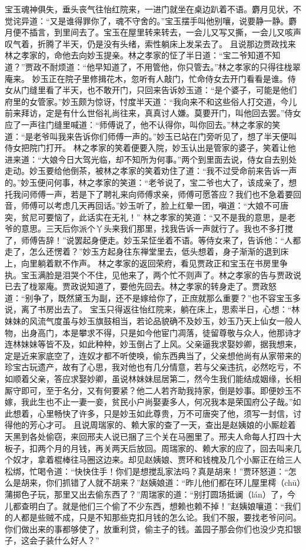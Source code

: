 \documentclass[12pt,oneside]{book}
\begin{document}
宝玉魂神俱失，垂头丧气往怡红院来，一进门就坐在桌边趴着不语。麝月见状，不觉诧异道：“又是谁得罪你了，魂不守舍的。”宝玉摆手叫他别嚷，说要静一静。麝月便不插言，到里间去了。宝玉在屋里转来转去，一会儿又写又撕，一会儿又咳声叹气着，折腾了半天，仍是没有头绪，索性躺床上发呆去了。
且说那边贾政找来林之孝家的，命他去向妙玉提亲。林之孝家的怔了半日道：“宝二爷知道不知道？”贾政不耐烦道：“他早知道了，不用管他，你只管去。”林之孝家的只得往栊翠庵来。
妙玉正在院子里修揖花木，忽听有人敲门，忙命侍女去开门看看是谁。侍女从门缝里看了半天，也不敢开门，只回来告诉妙玉道：“是个婆子，可能是他们府里的女管家。”妙玉颇为惊讶，忖度半天道：“我向来不和这些俗人打交道，今儿前来拜访，定是有什么世俗礼尚往来，真真讨人嫌。莫要开门，叫他回去罢。”侍女应了一声往门缝里喊道：“师傅说了，他不认得你，叫你回去。”林之孝家的笑道：“是老爷叫我来告诉你们师傅一声的。”妙玉已站在门旁听见了，想了半天便叫侍女把院门打开。
林之孝家的笑着便要入院，妙玉认出是管家的婆子，笑着让他进来道：“大娘今日大驾光临，却不知所为何事。”两个到里面去说，侍女自去别处走动。妙玉要给他倒茶，被林之孝家的笑着劝住了道：“我不过受命前来告诉一声的。”妙玉便问何事，林之孝家的笑道：“老爷说了，宝二爷也大了，该成亲了，想托我问师傅一声，若是下了聘礼来向师傅求亲，师傅可愿答应？我们也不急着要回音，师傅可以考虑几天再回话。”妙玉听了，脸上红晕一团，嗔道：“大娘不可唐突，贫尼可要恼了，此话实在无礼！”
林之孝家的笑道：“又不是我的意思，是老爷的意思。三天后你派个丫头来我们那里，找我告诉一声就行了。我也不多打搅了，师傅告辞！”说罢起身便走。妙玉呆怔坐着不语。等侍女来了，告诉他：“人都走了，怎么还愣着？”妙玉方起身往东禅堂里去，低头想着，身子渐渐的退到床上，向里躺着默不作声。
林之孝家的返回荣府，看见贾政正和宝玉在书房里争执。宝玉满脸是泪哭个不住，见他来了，两个忙不则声了。林之孝家的告与贾政说已去了栊翠庵。贾政说知道了，要他先回去。林之孝家的转身走了。贾政怒道：“别争了，既然黛玉为副，还不是嫁给你了，正庶就那么重要？”也不容宝玉多说，离了书房出去了。
宝玉只得返往怡红院来，躺在床上，思索半日，心想：“林妹妹的风流气度虽与妙玉旗鼓相当，若论品貌确不及妙玉，妙玉乃天上仙女一般人物，出身高门，本是攀求不得，只是如今他宦门凋落，徒留尊敬与众人，他那诗才连林妹妹等皆不及，如此种种，妙玉倒占了上风。父亲逼我求娶妙卿，据我想来，定是近来家底空了，连奴才都不听使唤，偷东西典当了，父亲想他尚有从家带来的珍宝古玩遗产，故有了心思，我对他也有几分情意，若与父亲违抗，必然吃亏，不如顺着父亲，答应求娶妙卿，虽说林妹妹屈居第二，然今生我们能结成姻缘，长相厮守即可，至于名分，又有何要紧？他二人若齐助我持家，倒是妙事。即便妙玉不嫁，我此生也不止一妻一妾，贫民小户尚娶妻多人，何况我本是荣国府公子哉。”如此想着，心里畅快了许多，只是妙玉如此尊贵，万不可唐突了他，须写一封信，讨得他的芳心才可。
且说周瑞家的、赖大家的查了一天，查出是赵姨娘的小厮趁着天黑到各处偷窃，来回邢夫人说已捆了三个关在马圈里了。邢夫人命每人打四十大板子，扣两个月的月钱，再关两天后放回。周瑞家的、赖大家的应了，回去叫来几个奴才，拿着棍棒往马圈这边来。却见赵姨娘、贾环和钱槐及几个小厮正在给三人松绑，忙喝令道：“快快住手！你们是想搅乱家法吗？真是胡来！”贾环怒道：“怎么是胡来，你们抓错了人就不胡来？”赵姨娘道：“昨儿他们都在环儿屋里樗（chū）蒲掷色子玩，那里又出去偷东西了？”周瑞家的道：“别打圆场抵谰（lán）了，今儿都查明白了。就是他们三个偷了不少东西，想赖也赖不掉！”赵姨娘嚷道：“我们的人都是些贼不成，只是不知那些克扣月钱的怎么论。我们不服，要找老爷问问。你们做出来的事都够使了，放重利贷，偷主子的钱。盖园子那会你们也没少克扣银子，这会子装什么好人？”
\end{document}

